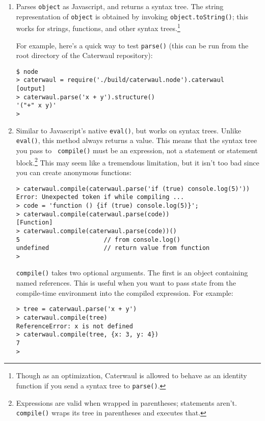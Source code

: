 \documentclass{report}
\begin{document}
\begin{enumerate}
\item[{\tt parse(object)}]
  Parses {\tt object} as Javascript, and returns a syntax tree. The string representation of {\tt object} is obtained by invoking {\tt object.toString()}; this works for strings,
  functions, and other syntax trees.\footnote{Though as an optimization, Caterwaul is allowed to behave as an identity function if you send a syntax tree to {\tt parse()}.}

  For example, here's a quick way to test {\tt parse()} (this can be run from the root directory of the Caterwaul repository):

\begin{verbatim}
$ node
> caterwaul = require('./build/caterwaul.node').caterwaul
[output]
> caterwaul.parse('x + y').structure()
'("+" x y)'
>
\end{verbatim}

\item[{\tt compile(tree)}]
  Similar to Javascript's native {\tt eval()}, but works on syntax trees. Unlike {\tt eval()}, this method always returns a value. This means that the syntax tree you pass to {\tt
  compile()} must be an expression, not a statement or statement block.\footnote{Expressions are valid when wrapped in parentheses; statements aren't. {\tt compile()} wraps its tree in
  parentheses and executes that.} This may seem like a tremendous limitation, but it isn't too bad since you can create anonymous functions:

\begin{verbatim}
> caterwaul.compile(caterwaul.parse('if (true) console.log(5)'))
Error: Unexpected token if while compiling ...
> code = 'function () {if (true) console.log(5)}';
> caterwaul.compile(caterwaul.parse(code))
[Function]
> caterwaul.compile(caterwaul.parse(code))()
5                       // from console.log()
undefined               // return value from function
>
\end{verbatim}

  {\tt compile()} takes two optional arguments. The first is an object containing named references. This is useful when you want to pass state from the compile-time environment into the
  compiled expression. For example:

\begin{verbatim}
> tree = caterwaul.parse('x + y')
> caterwaul.compile(tree)
ReferenceError: x is not defined
> caterwaul.compile(tree, {x: 3, y: 4})
7
>
\end{verbatim}


\end{enumerate}
\end{document}
